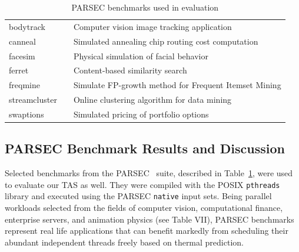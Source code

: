 \documentclass[times, 10pt,twocolumn]{IEEEtran}
\begin{document}
\begin{small}
\begin{table}[phbt] 
\centering
 \caption{PARSEC benchmarks used in evaluation}
\label{tab:parsecbench}
\begin{tabular}[bthp]{l l p{5cm}} 
\hline 
\hline 
bodytrack &  & Computer vision image tracking application \\
canneal &  & Simulated annealing chip routing cost computation \\
facesim &  & Physical simulation of facial behavior \\
ferret &  & Content-based similarity search \\
freqmine &  & Simulate FP-growth method for Frequent Itemset Mining \\
streamcluster &  & Online clustering algorithm for data mining \\
swaptions &  & Simulated pricing of portfolio options \\
\hline
\end{tabular}
\end{table}
\end{small}
\subsection{PARSEC Benchmark Results and Discussion}
\label{sec:mult-behav} 
Selected benchmarks from the PARSEC~\cite{Bienia2011} suite, described
in Table~\ref{tab:parsecbench}, were used to evaluate our TAS as well.
They were compiled with the POSIX \texttt{pthreads} library and executed
using the PARSEC \texttt{native} input sets.  Being parallel workloads
selected from the fields of computer vision, computational finance,
enterprise servers, and animation physics (see Table VII), PARSEC
benchmarks represent real life applications that 
can benefit markedly from scheduling their abundant independent threads
freely based on thermal prediction.
\end{document}
